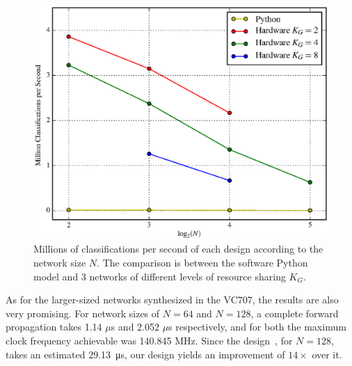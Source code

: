 \documentclass{IEEEtran}
\begin{document}
\begin{figure}
    \centering
    \includegraphics[width=\linewidth]{figures/Mclass-psec.eps}
    \caption[Millions of classifications per second of each design according to the network size $N$]{Millions of classifications per second of each design according to the network size $N$. The comparison is between the software Python model and 3 networks of different levels of resource sharing $K_G$.}
    \label{fig:Mclass-psec}
\end{figure}

As for the larger-sized networks synthesized in the VC707, the results are also very promising. For network sizes of $N=64$ and $N=128$, a complete
forward propagation takes 1.14 $\mu$s and 2.052 $\mu$s respectively, and for both the maximum clock frequency achievable was 140.845 MHz. Since the
design~\cite{Chang15}, for $N=128$, takes an estimated \SI{29.13}{\micro\second}, our design yields an improvement of $14\times$
over it.
\end{document}
